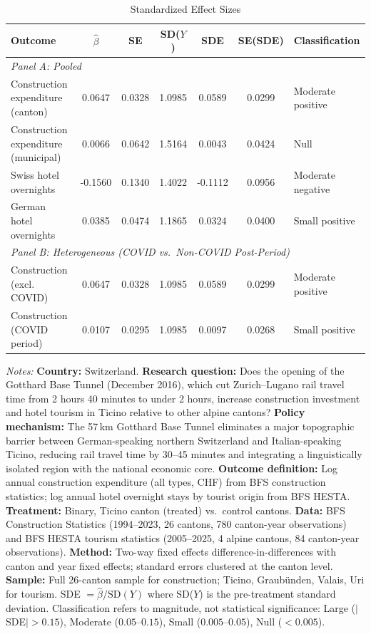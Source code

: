 \begin{table}[t]
\centering
\caption{Standardized Effect Sizes}
\label{tab:sde}
\footnotesize
\begin{tabular}{lcccccp{2.2cm}}
\toprule
Outcome & $\hat{\beta}$ & SE & SD($Y$) & SDE & SE(SDE) & Classification \\
\midrule
\multicolumn{7}{l}{\textit{Panel A: Pooled}} \\[3pt]
Construction expenditure (canton) & 0.0647 & 0.0328 & 1.0985 & 0.0589 & 0.0299 & Moderate positive \\
Construction expenditure (municipal) & 0.0066 & 0.0642 & 1.5164 & 0.0043 & 0.0424 & Null \\
Swiss hotel overnights & -0.1560 & 0.1340 & 1.4022 & -0.1112 & 0.0956 & Moderate negative \\
German hotel overnights & 0.0385 & 0.0474 & 1.1865 & 0.0324 & 0.0400 & Small positive \\
\midrule
\multicolumn{7}{l}{\textit{Panel B: Heterogeneous (COVID vs.\ Non-COVID Post-Period)}} \\[3pt]
Construction (excl. COVID) & 0.0647 & 0.0328 & 1.0985 & 0.0589 & 0.0299 & Moderate positive \\
Construction (COVID period) & 0.0107 & 0.0295 & 1.0985 & 0.0097 & 0.0268 & Small positive \\
\bottomrule
\end{tabular}
\begin{tablenotes}[flushleft]
\small
\item \textit{Notes:} \textbf{Country:} Switzerland. \textbf{Research question:} Does the opening of the Gotthard Base Tunnel (December 2016), which cut Zurich--Lugano rail travel time from 2 hours 40 minutes to under 2 hours, increase construction investment and hotel tourism in Ticino relative to other alpine cantons? \textbf{Policy mechanism:} The 57\,km Gotthard Base Tunnel eliminates a major topographic barrier between German-speaking northern Switzerland and Italian-speaking Ticino, reducing rail travel time by 30--45 minutes and integrating a linguistically isolated region with the national economic core. \textbf{Outcome definition:} Log annual construction expenditure (all types, CHF) from BFS construction statistics; log annual hotel overnight stays by tourist origin from BFS HESTA. \textbf{Treatment:} Binary, Ticino canton (treated) vs.\ control cantons. \textbf{Data:} BFS Construction Statistics (1994--2023, 26 cantons, 780 canton-year observations) and BFS HESTA tourism statistics (2005--2025, 4 alpine cantons, 84 canton-year observations). \textbf{Method:} Two-way fixed effects difference-in-differences with canton and year fixed effects; standard errors clustered at the canton level. \textbf{Sample:} Full 26-canton sample for construction; Ticino, Graub\"unden, Valais, Uri for tourism. SDE $= \hat{\beta} / \text{SD}(Y)$ where SD($Y$) is the pre-treatment standard deviation. Classification refers to magnitude, not statistical significance: Large ($|$SDE$| > 0.15$), Moderate ($0.05$--$0.15$), Small ($0.005$--$0.05$), Null ($< 0.005$).
\end{tablenotes}
\end{table}
